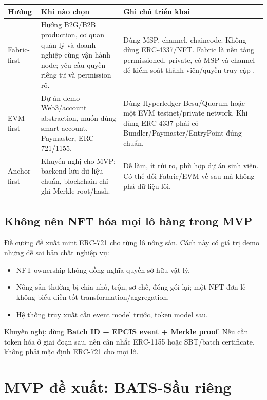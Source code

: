 \documentclass[12pt,a4paper]{article}
\begin{document}
\begin{longtable}{p{3cm}p{5.4cm}p{5.4cm}}
\toprule
\textbf{Hướng} & \textbf{Khi nào chọn} & \textbf{Ghi chú triển khai} \\
\midrule
\endhead
Fabric-first & Hướng B2G/B2B production, cơ quan quản lý và doanh nghiệp cùng vận hành node; yêu cầu quyền riêng tư và permission rõ. & Dùng MSP, channel, chaincode. Không dùng ERC-4337/NFT. Fabric là nền tảng permissioned, private, có MSP và channel để kiểm soát thành viên/quyền truy cập \cite{fabric_intro,fabric_msp}. \\
\addlinespace
EVM-first & Dự án demo Web3/account abstraction, muốn dùng smart account, Paymaster, ERC-721/1155. & Dùng Hyperledger Besu/Quorum hoặc một EVM testnet/private network. Khi dùng ERC-4337 phải có Bundler/Paymaster/EntryPoint đúng chuẩn. \\
\addlinespace
Anchor-first & Khuyến nghị cho MVP: backend lưu dữ liệu chuẩn, blockchain chỉ ghi Merkle root/hash. & Dễ làm, ít rủi ro, phù hợp dự án sinh viên. Có thể đổi Fabric/EVM về sau mà không phá dữ liệu lõi. \\
\bottomrule
\end{longtable}

\subsection{Không nên NFT hóa mọi lô hàng trong MVP}

Đề cương đề xuất mint ERC-721 cho từng lô nông sản. Cách này có giá trị demo nhưng dễ sai bản chất nghiệp vụ:

\begin{itemize}[leftmargin=2em]
    \item NFT ownership không đồng nghĩa quyền sở hữu vật lý.
    \item Nông sản thường bị chia nhỏ, trộn, sơ chế, đóng gói lại; một NFT đơn lẻ không biểu diễn tốt transformation/aggregation.
    \item Hệ thống truy xuất cần event model trước, token model sau.
\end{itemize}

Khuyến nghị: dùng \textbf{Batch ID + EPCIS event + Merkle proof}. Nếu cần token hóa ở giai đoạn sau, nên cân nhắc ERC-1155 hoặc SBT/batch certificate, không phải mặc định ERC-721 cho mọi lô.

\section{MVP đề xuất: BATS-Sầu riêng}
\end{document}
